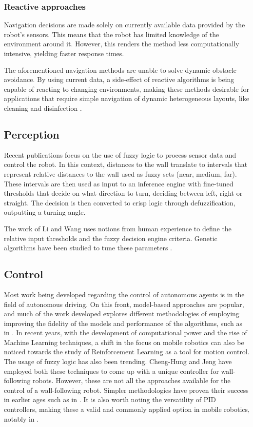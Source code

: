 \documentclass[conference]{IEEEtran}
\begin{document}
\subsubsection{Reactive approaches}
Navigation decisions are made solely on currently available data provided by the robot's sensors. This means that the robot has limited knowledge of the environment around it. However, this renders the method less computationally intensive, yielding faster response times.

The aforementioned navigation methods are unable to solve dynamic obstacle avoidance. By using current data, a side-effect of reactive algorithms is being capable of reacting to changing environments, making these methods desirable for applications that require simple navigation of dynamic heterogeneous layouts, like cleaning and disinfection \cite{9826258}. 

\subsection{Perception}
Recent publications focus on the use of fuzzy logic to process sensor data and control the robot. In this context, distances to the wall translate to intervals that represent relative distances to the wall used as fuzzy sets (near, medium, far). These intervals are then used as input to an inference engine with fine-tuned thresholds that decide on what direction to turn, deciding between left, right or straight. The decision is then converted to crisp logic through defuzzification, outputting a turning angle.

The work of Li and Wang\cite{7166006} uses notions from human experience to define the relative input thresholds and the fuzzy decision engine criteria. Genetic algorithms have been studied to tune these parameters \cite{5159805}.

\subsection{Control}
Most work being developed regarding the control of autonomous agents is in the field of autonomous driving. On this front, model-based approaches are popular, and much of the work developed explores different methodologies of employing improving the fidelity of the models and performance of the algorithms, such as in \cite{7225830}. In recent years, with the development of computational power and the rise of Machine Learning techniques, a shift in the focus on mobile robotics can also be noticed towards the study of Reinforcement Learning as a tool for motion control. The usage of fuzzy logic has also been trending. Cheng-Hung and Jeng \cite{math8081254} have employed both these techniques to come up with a unique controller for wall-following robots. However, these are not all the approaches available for the control of a wall-following robot. Simpler methodologies have proven their success in earlier ages such as in \cite{677372}. It is also worth noting the versatility of PID controllers, making these a valid and commonly applied option in mobile robotics, notably in \cite{lee2018design, normey2001mobile}. 
\end{document}
